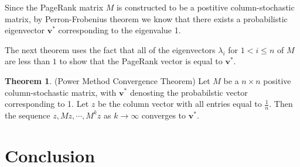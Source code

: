 \documentclass[11pt]{article}
\theoremstyle{definition}
\newtheorem{theorem}{Theorem}
\renewcommand{\vec}[1]{\mathbf{#1}}
\begin{document}
Since the PageRank matrix $M$ is constructed to be a postitive column-stochastic matrix, by Perron-Frobenius theorem we know that there exists a probabilistic eigenvector $\vec{v}^*$ corresponding to the eigenvalue 1.

The next theorem uses the fact that all of the eigenvectors $\lambda_i$ for $1<i\leq n$ of $M$ are less than $1$ to show that the PageRank vector is equal to $\vec{v}^*$.
\begin{theorem}
    (Power Method Convergence Theorem) Let $M$ be a $n\times n$ positive column-stochastic matrix, with $\vec{v}^*$ denosting the probabilstic vector corresponding to 1. Let $z$ be the column vector with all entries equal to $\frac{1}{n}$. Then the sequence $z, Mz, \cdots, M^kz$ as $k\to \infty$ converges to $\vec{v}^*$.    
\end{theorem}



\section{Conclusion}

\begin{thebibliography}{9}
\bibitem{}

\end{thebibliography}
\end{document}
